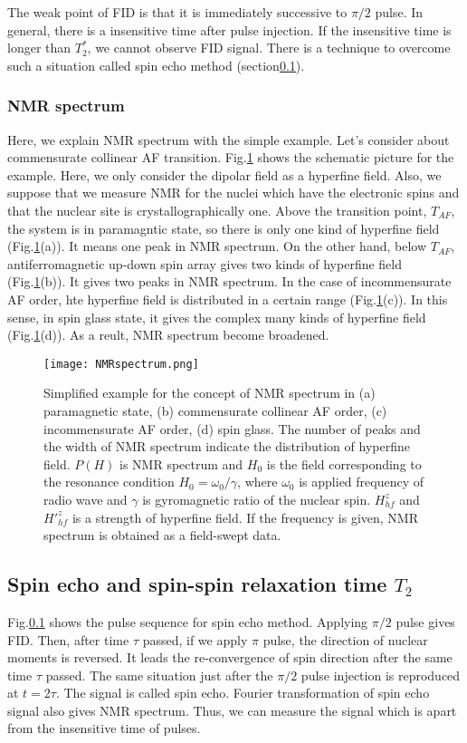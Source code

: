 The weak point of FID is that it is immediately successive to $\pi/2$ pulse.
In general, there is a insensitive time after pulse injection.
If the insensitive time is longer than $T^*_2$, we cannot observe FID signal.
There is a technique to overcome such a situation called spin echo method (section\ref{spin_echo}).


\subsubsection{NMR spectrum}
Here, we explain NMR spectrum with the simple example.
Let's consider about commensurate collinear AF transition.
Fig.\ref{NMRspectrum} shows the schematic picture for the example.
Here, we only consider the dipolar field as a hyperfine field.
Also, we suppose that we measure NMR for the nuclei which have the electronic spins and that the nuclear site is crystallographically one.
Above the transition point, $T_{AF}$, the system is in paramagntic state, so there is only one kind of hyperfine field (Fig.\ref{NMRspectrum}(a)).
It means one peak in NMR spectrum.
On the other hand, below $T_{AF}$, antiferromagnetic up-down spin array gives two kinds of hyperfine field (Fig.\ref{NMRspectrum}(b)).
It gives two peaks in NMR spectrum.
In the case of incommensurate AF order, hte hyperfine field is distributed in a certain range (Fig.\ref{NMRspectrum}(c)).
In this sense, in spin glass state, it gives the complex many kinds of hyperfine field (Fig.\ref{NMRspectrum}(d)).
As a reult, NMR spectrum become broadened.

\begin{figure}
  \centering
  \texttt{[image: NMRspectrum.png]}
  \caption{Simplified example for the concept of NMR spectrum
  in (a) paramagnetic state, (b) commensurate collinear AF order,  (c) incommensurate AF order, (d) spin glass.
  The number of peaks and the width of NMR spectrum indicate the distribution of hyperfine field.
  $P(H)$ is NMR spectrum and $H_0$ is the field corresponding to the resonance condition $H_0 = \omega_0/\gamma$,
  where $\omega_0$ is applied frequency of radio wave and $\gamma$ is gyromagnetic ratio of the nuclear spin.
  $H^z_{hf}$ and $H'^z_{hf}$ is a strength of hyperfine field.
  If the frequency is given, NMR spectrum is obtained as a field-swept data.}
  \label{NMRspectrum}
\end{figure}


\subsection{Spin echo and spin-spin relaxation time $T_2$}
\label{spin_echo}
Fig.\ref{spin_echo} shows the pulse sequence for spin echo method.
Applying $\pi/2$ pulse gives FID.
Then, after time $\tau$ passed, if we apply $\pi$ pulse, the direction of nuclear moments is reversed.
It leads the re-convergence of spin direction after the same time $\tau$ passed.
The same situation just after the $\pi/2$ pulse injection is reproduced at $t = 2\tau$.
The signal is called spin echo.
Fourier transformation of spin echo signal also gives NMR spectrum.
Thus, we can measure the signal which is apart from the insensitive time of pulses.

